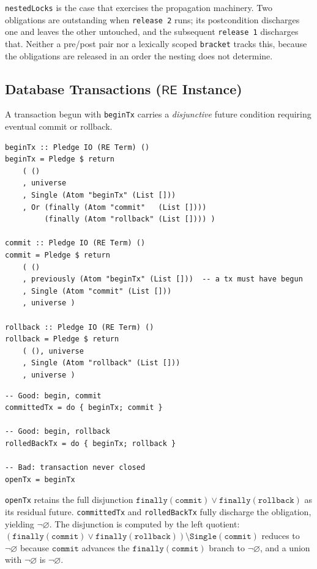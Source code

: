 \documentclass[acmsmall,screen]{acmart}
\newcommand{\RE}{\mathsf{RE}}
\newcommand{\finally}[1]{\mathtt{finally}(#1)}
\newcommand{\univ}{\neg\varnothing}
\newcommand{\lquot}{\mathbin{\setminus}}   %
\begin{document}
\noindent
\lstinline{nestedLocks} is the case that exercises the propagation
machinery.
Two obligations are outstanding when \lstinline{release 2} runs; its
postcondition discharges one and leaves the other untouched, and the
subsequent \lstinline{release 1} discharges that.
Neither a pre/post pair nor a lexically scoped \lstinline{bracket} tracks
this, because the obligations are released in an order the nesting does not
determine.

\subsection{Database Transactions (\texorpdfstring{$\RE$}{RE} Instance)}
\label{sec:ex-tx}

A transaction begun with \lstinline{beginTx} carries a
\emph{disjunctive} future condition requiring eventual commit or rollback.

\begin{lstlisting}
beginTx :: Pledge IO (RE Term) ()
beginTx = Pledge $ return
    ( ()
    , universe
    , Single (Atom "beginTx" (List []))
    , Or (finally (Atom "commit"   (List [])))
         (finally (Atom "rollback" (List []))) )

commit :: Pledge IO (RE Term) ()
commit = Pledge $ return
    ( ()
    , previously (Atom "beginTx" (List []))  -- a tx must have begun
    , Single (Atom "commit" (List []))
    , universe )

rollback :: Pledge IO (RE Term) ()
rollback = Pledge $ return
    ( (), universe
    , Single (Atom "rollback" (List []))
    , universe )
\end{lstlisting}

\begin{lstlisting}
-- Good: begin, commit
committedTx = do { beginTx; commit }

-- Good: begin, rollback
rolledBackTx = do { beginTx; rollback }

-- Bad: transaction never closed
openTx = beginTx
\end{lstlisting}

\noindent
\lstinline{openTx} retains the full disjunction
$\finally{\mathtt{commit}} \vee \finally{\mathtt{rollback}}$ as its residual
future.
\lstinline{committedTx} and \lstinline{rolledBackTx} fully discharge the
obligation, yielding $\univ$.
The disjunction is computed by the left quotient:
$(\finally{\mathtt{commit}} \vee \finally{\mathtt{rollback}}) \lquot
\mathtt{Single}(\mathtt{commit})$
reduces to $\univ$ because $\mathtt{commit}$ advances the
$\finally{\mathtt{commit}}$ branch to $\univ$, and a union with $\univ$ is
$\univ$.
\end{document}
